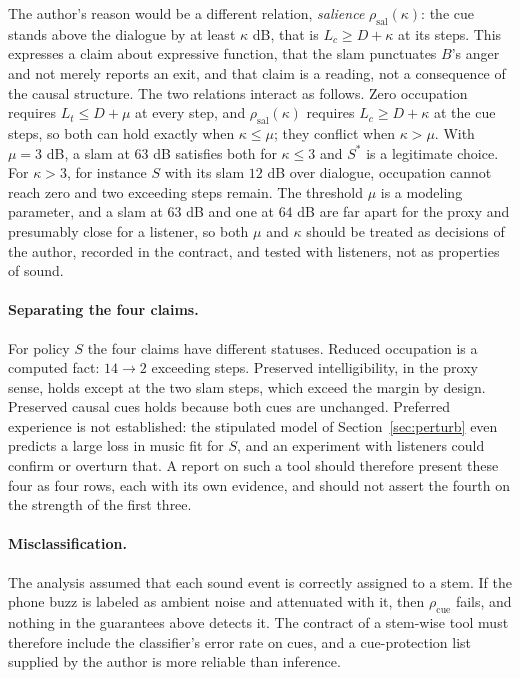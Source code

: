The author's reason would be a different relation, \emph{salience} $\rho_{\mathrm{sal}}(\kappa)$: the cue stands above the dialogue by at least $\kappa$ dB, that is $L_c\ge D+\kappa$ at its steps. This expresses a claim about expressive function, that the slam punctuates $B$'s anger and not merely reports an exit, and that claim is a reading, not a consequence of the causal structure. The two relations interact as follows. Zero occupation requires $L_t\le D+\mu$ at every step, and $\rho_{\mathrm{sal}}(\kappa)$ requires $L_c\ge D+\kappa$ at the cue steps, so both can hold exactly when $\kappa\le\mu$; they conflict when $\kappa>\mu$. With $\mu=3$ dB, a slam at $63$ dB satisfies both for $\kappa\le3$ and $S^*$ is a legitimate choice. For $\kappa>3$, for instance $S$ with its slam $12$ dB over dialogue, occupation cannot reach zero and two exceeding steps remain. The threshold $\mu$ is a modeling parameter, and a slam at $63$ dB and one at $64$ dB are far apart for the proxy and presumably close for a listener, so both $\mu$ and $\kappa$ should be treated as decisions of the author, recorded in the contract, and tested with listeners, not as properties of sound.

\paragraph{Separating the four claims.} For policy $S$ the four claims have different statuses. Reduced occupation is a computed fact: $14\to2$ exceeding steps. Preserved intelligibility, in the proxy sense, holds except at the two slam steps, which exceed the margin by design. Preserved causal cues holds because both cues are unchanged. Preferred experience is not established: the stipulated model of Section~\ref{sec:perturb} even predicts a large loss in music fit for $S$, and an experiment with listeners could confirm or overturn that. A report on such a tool should therefore present these four as four rows, each with its own evidence, and should not assert the fourth on the strength of the first three.

\paragraph{Misclassification.} The analysis assumed that each sound event is correctly assigned to a stem. If the phone buzz is labeled as ambient noise and attenuated with it, then $\rho_{\mathrm{cue}}$ fails, and nothing in the guarantees above detects it. The contract of a stem-wise tool must therefore include the classifier's error rate on cues, and a cue-protection list supplied by the author is more reliable than inference.

